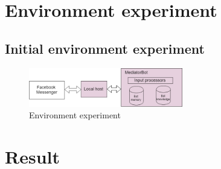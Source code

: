 \documentclass[letterpaper%
, twoside%
, 12pt%
,these%
, english%
,creativecommons,hyperref, withAlgo2e %
]{thETS}
\begin{document}
\section{Environment experiment}
\subsection{Initial environment experiment}
\begin{figure}
	\includegraphics[width=0.6\textwidth]{Figures/ue1.png}
	\caption{Environment experiment}
	\label{env}
\end{figure}

\section{Result}




\end{document}
